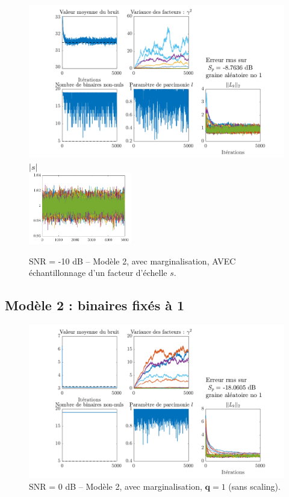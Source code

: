 \documentclass[ 12pt]{article}
\begin{document}
\begin{figure}[H]
	\centering
	\includegraphics[width=\textwidth]{ToyCase/scalingon_snrm10db.png}\\
	{\scriptsize $|s|$}\\
	\includegraphics[width=0.4\textwidth]{ToyCase/s_snrm10db.png}
	\caption{SNR = -10 dB -- Modèle 2, avec marginalisation, AVEC échantillonnage d'un facteur d'échelle $s$.}
\end{figure}

\subsection{Modèle 2 : binaires fixés à 1}
\begin{figure}[H]
	\centering
	\includegraphics[width=\textwidth]{ToyCase/qfixe1.png}
	\caption{SNR = 0 dB -- Modèle 2, avec marginalisation, $\bm{q}=1$ (sans scaling).}
\end{figure}
\end{document}
